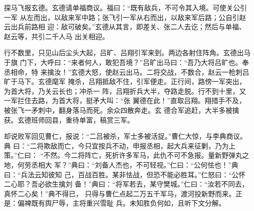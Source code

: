 探马飞报玄德。玄德请单福商议。福曰：“既有敌兵，不可令其入境。可使关公引一军
从左而出，以敌来军中路；张飞引一军从右而出，以敌来军后路；公自引赵云出兵前路相
迎：敌可破矣。”玄德从其言，即差关、张二人去讫；然后与单福、赵云等，共引二千人马
出关相迎。

行不数里，只见山后尘头大起，吕旷、吕翔引军来到。两边各射住阵角。玄德出马于旗
门下，大呼曰：“来者何人，敢犯吾境？”吕旷出马曰：“吾乃大将吕旷也。奉丞相命，特
来擒汝！”玄德大怒，使赵云出马。二将交战，不数合，赵云一枪刺吕旷于马下。玄德麾军
掩杀，吕翔抵敌不住，引军便走。正行间，路傍一军突出，为首大将，乃关云长也；冲杀一
阵，吕翔折兵大半，夺路走脱。行不到十里，又一军拦住去路，为首大将，挺矛大叫：“张
翼德在此！”直取吕翔。翔措手不及，被张飞一矛刺中，翻身落马而死。余众四散奔走。玄
德合军追赶，大半多被擒获。玄德班师回县，重待单富，稿赏三军。

却说败军回见曹仁，报说：“二吕被杀，军士多被活捉。”曹仁大惊，与李典商议。典
曰：“二将欺敌而亡，今只宜按兵不动，申报丞相，起大兵来征剿，乃为上策。”仁曰：
“不然。今二将阵亡，死折许多军马，此仇不可不急报。量新野弹丸之地，何劳丞相大
军？”典曰：“刘备人杰也，不可轻视。”仁曰：“公何怯也！”典曰：“兵法云知彼知
己，百战百胜。某非怯战，但恐不能必胜耳。”仁怒曰：“公怀二心耶？吾必欲生擒刘
备！”典曰：“将军若去，某守樊城。”仁曰：“汝若不同去，真怀二心矣！”典不得已，
只得与曹仁点起二万五千军马，渡河投新野而来。正是：偏裨既有舆尸辱，主将重兴雪耻
兵。未知胜负何如，且听下文分解。